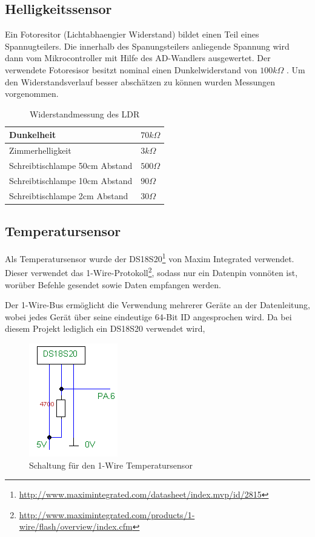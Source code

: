 \subsection{Helligkeitssensor}
Ein Fotoresitor (Lichtabhaengier Widerstand) bildet einen Teil eines Spannugteilers. Die innerhalb des Spanungsteilers anliegende Spannung wird dann vom Mikrocontroller mit Hilfe des AD-Wandlers ausgewertet.
Der verwendete Fotoresisor besitzt nominal einen Dunkelwiderstand von $100 k\Omega$ .
Um den Widerstandsverlauf besser abschätzen zu können wurden Messungen vorgenommen.
\begin{table}[htp]
\begin{tabular}{||l | l||}
  \hline \hline
  Dunkelheit& $70 k\Omega$ \\ \hline
  Zimmerhelligkeit & $3 k\Omega$ \\ \hline
  Schreibtischlampe 50cm Abstand& $500 \Omega$ \\ \hline
  Schreibtischlampe 10cm Abstand& $90 \Omega$ \\ \hline
  Schreibtischlampe 2cm Abstand& $30 \Omega$  \\
  \hline\hline
\end{tabular}
\caption{Widerstandmessung des LDR}
\end{table}
  
\subsection{Temperatursensor}
Als Temperatursensor wurde der DS18S20\footnote{\url{http://www.maximintegrated.com/datasheet/index.mvp/id/2815}} von Maxim Integrated verwendet. Dieser verwendet das 1-Wire\textsuperscript{\textregistered}-Protokoll\footnote{\url{http://www.maximintegrated.com/products/1-wire/flash/overview/index.cfm}}, sodass nur ein Datenpin vonnöten ist, worüber Befehle gesendet sowie Daten empfangen werden.

Der 1-Wire-Bus ermöglicht die Verwendung mehrerer Geräte an der Datenleitung, wobei jedes Gerät über seine eindeutige 64-Bit ID angesprochen wird. Da bei diesem Projekt lediglich ein DS18S20 verwendet wird, 

\begin{figure}[htp]
\centering
\includegraphics{skizzen/temperatursensor_schematic.png}
\caption{Schaltung für den 1-Wire Temperatursensor}\label{fig_tempsensor}
\end{figure}

